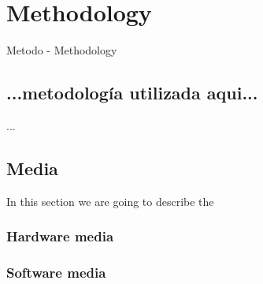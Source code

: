 \chapter{Methodology} %
\label{chap:methodology}


Metodo - Methodology


\section{...metodología utilizada aqui...}

...



\section{Media} %
In this section we are going to describe the

\subsection{Hardware media}


\subsection{Software media}
